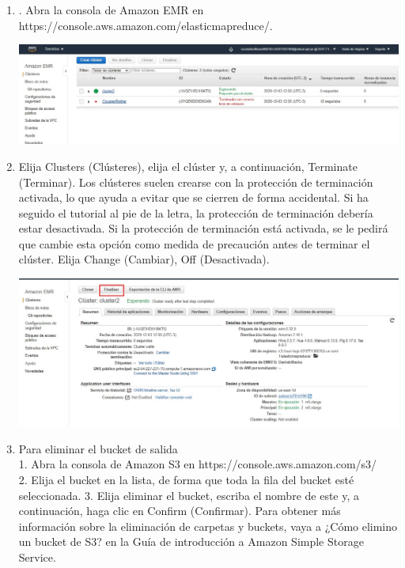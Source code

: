\documentclass[12pt,letterpaper]{article}
\begin{document}
\begin{enumerate}
\begin{enumerate}
\begin{enumerate}
	\item . Abra la consola de Amazon EMR en https://console.aws.amazon.com/elasticmapreduce/. 
	\begin{center}
		\includegraphics[width=14cm]{./img/5.1.jpg} 
	\end{center}
	\item Elija Clusters (Clústeres), elija el clúster y, a continuación, Terminate (Terminar).
	Los clústeres suelen crearse con la protección de terminación activada, lo que ayuda a evitar que se
	cierren de forma accidental. Si ha seguido el tutorial al pie de la letra, la protección de terminación
	debería estar desactivada. Si la protección de terminación está activada, se le pedirá que cambie esta
	opción como medida de precaución antes de terminar el clúster. Elija Change (Cambiar), Off
	(Desactivada). 
	\begin{center}
		\includegraphics[width=14cm]{./img/5.2.jpg} 
	\end{center}
	\item Para eliminar el bucket de salida
 \\	1. Abra la consola de Amazon S3 en https://console.aws.amazon.com/s3/
\\	2. Elija el bucket en la lista, de forma que toda la fila del bucket esté seleccionada. 3. Elija eliminar el
	bucket, escriba el nombre de este y, a continuación, haga clic en Confirm (Confirmar).
	Para obtener más información sobre la eliminación de carpetas y buckets, vaya a ¿Cómo elimino un
	bucket de S3? en la Guía de introducción a Amazon Simple Storage Service.


\end{enumerate}
\end{enumerate}
\end{enumerate}
\end{document}
